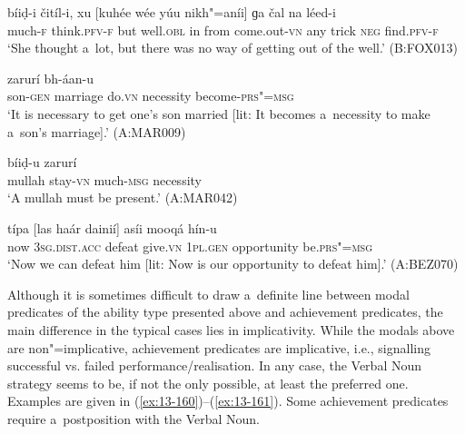 \begin{exe}
\ex
\label{ex:13-156}
\gll bíiḍ-i čitíl-i, xu [kuhée wée yúu   nikh"=aníi] ɡa čal na léed-i  \\
much-\textsc{f} think.\textsc{pfv-f} but well.\textsc{obl} in from  come.out-\textsc{vn} any trick \textsc{neg} find.\textsc{pfv-f}  \\
\glt `She thought a~lot, but there was no way of getting out of the well.' (B:FOX013)

\ex
\label{ex:13-157}
 zarurí bh-áan-u \\
son-\textsc{gen} marriage do.\textsc{vn} necessity become-\textsc{prs"=msg}  \\
\glt `It is necessary to get one's son married [lit: It becomes a~necessity to make a~son's marriage].' (A:MAR009)

\ex
\label{ex:13-158}
\gll [muloó haans"=ainií] bíiḍ-u zarurí \\
mullah stay-\textsc{vn}  much-\textsc{msg} necessity  \\
\glt `A mullah must be present.' (A:MAR042)

\ex
\label{ex:13-159}
\gll típa [las haár dainií] asíi mooqá  hín-u \\
now \textsc{3sg.dist.acc} defeat give.\textsc{vn} \textsc{1pl.gen} opportunity be.\textsc{prs"=msg}  \\
\glt `Now we can defeat him [lit: Now is our opportunity to defeat him].' (A:BEZ070) 
\end{exe}

 Although it is sometimes difficult to draw a~definite line between modal predicates of the ability type presented above and achievement predicates, the main difference in the typical cases lies in implicativity. While the modals above are non"=implicative, achievement predicates are implicative, i.e., signalling successful vs. failed performance/realisation. In any case, the Verbal Noun strategy seems to be, if not the only possible, at least the preferred one. Examples are given in (\ref{ex:13-160})--(\ref{ex:13-161}). Some achievement predicates require a~postposition with the Verbal Noun.

